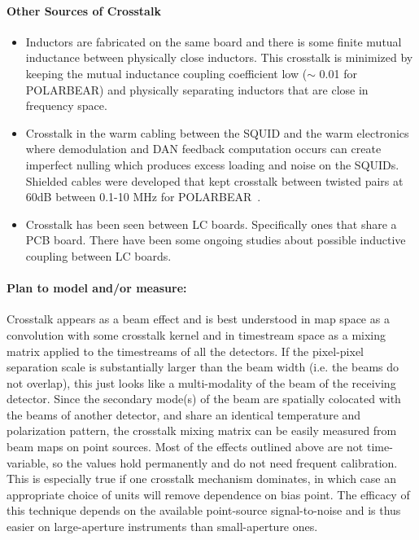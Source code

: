 \paragraph{Other Sources of Crosstalk}
\begin{itemize}

\item Inductors are fabricated on the same board and there is some finite mutual inductance between physically close inductors. This crosstalk is minimized by keeping the mutual inductance coupling coefficient low ($\sim$ 0.01 for POLARBEAR) and physically separating inductors that are close in frequency space. 
\item Crosstalk in the warm cabling between the SQUID and the warm electronics where demodulation and DAN feedback computation occurs can create imperfect nulling which produces excess loading and noise on the SQUIDs. Shielded cables were developed that kept crosstalk between twisted pairs at 60dB between 0.1-10 MHz for POLARBEAR~\cite{DfMux_Warm_Crosstalk_Memo}.
\item Crosstalk has been seen between LC boards. Specifically ones that share a PCB board. There have been some ongoing studies about possible inductive coupling between LC boards. %
\end{itemize}

\paragraph{Plan to model and/or measure:}

Crosstalk appears as a beam effect and is best understood in map space as a convolution with some crosstalk kernel and in timestream space as a mixing matrix applied to the timestreams of all the detectors.
If the pixel-pixel separation scale is substantially larger than the beam width (i.e. the beams do not overlap), this just looks like a multi-modality of the beam of the receiving detector.
Since the secondary mode(s) of the beam are spatially colocated with the beams of another detector, and share an identical temperature and polarization pattern, the crosstalk mixing matrix can be easily measured from beam maps on point sources.
Most of the effects outlined above are not time-variable, so the values hold permanently and do not need frequent calibration.
This is especially true if one crosstalk mechanism dominates, in which case an appropriate choice of units will remove dependence on bias point.
The efficacy of this technique depends on the available point-source signal-to-noise and is thus easier on large-aperture instruments than small-aperture ones.

